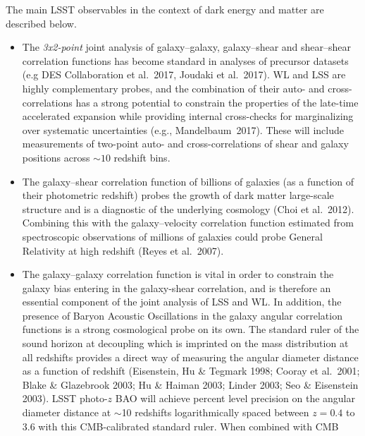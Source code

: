 The main LSST observables in the context of dark energy and matter are described below.

\begin{itemize}
\item The {\sl 3x2-point} joint analysis of galaxy--galaxy, galaxy--shear and shear--shear
correlation functions has become standard in analyses of precursor datasets (e.g DES Collaboration
et al.~2017, Joudaki et al.~2017). WL and LSS are highly complementary probes, and the combination
of their auto- and cross-correlations has a strong
potential to constrain the properties of the late-time accelerated expansion while providing
internal cross-checks for marginalizing over systematic uncertainties (e.g., Mandelbaum~2017).
These will include measurements of two-point auto- and cross-correlations of shear and
galaxy positions 
across $\sim 10$ redshift bins.
%
\item The galaxy--shear correlation function of billions of galaxies (as a function of their
photometric redshift) probes the growth of dark matter large-scale structure and is a
diagnostic of the underlying cosmology (Choi et al.~2012). Combining this with the
galaxy--velocity correlation function estimated from spectroscopic observations of millions of galaxies
could probe General Relativity at high redshift (Reyes et al.~2007).
%
\item The galaxy--galaxy correlation function is vital in
order to constrain the galaxy bias entering in the galaxy-shear correlation, and is therefore
an essential component of the joint analysis of LSS and WL. In addition, the presence of 
Baryon Acoustic Oscillations in the galaxy angular correlation functions is a strong cosmological
probe on its own. The standard ruler of the sound horizon at decoupling which is imprinted on the
mass distribution at all redshifts provides a direct way of measuring the angular diameter
distance as a function of redshift (Eisenstein, Hu \& Tegmark 1998;
Cooray et al.~2001; Blake \& Glazebrook 2003; Hu \& Haiman 2003; Linder 2003; Seo \&
Eisenstein 2003). LSST photo-$z$ BAO will achieve percent level precision on the angular
diameter distance at $\sim$10 redshifts logarithmically spaced between $z = 0.4$ to 3.6
with this CMB-calibrated standard ruler. When combined with CMB

\end{itemize}

